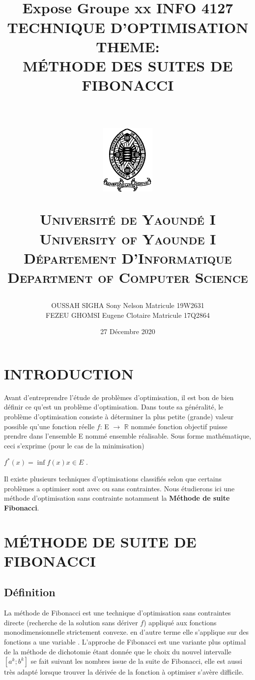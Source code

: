 \documentclass[a4paper,14pt]{article}
\title{
    \horrule{0.5pt} \\ [0.4cm]
    \Huge Expose Groupe xx INFO 4127 TECHNIQUE D'OPTIMISATION\\ THEME: \\ MÉTHODE DES SUITES DE FIBONACCI\\
    \horrule{2pt} \\[0.5cm]
\begin{center}
\includegraphics[width=100px]{univyde1}\\[15pt]
\end{center}
    \usefont{OT1}{bch}{b}{n}
    \normalfont \normalsize \textsc{Université de Yaoundé I\\University of Yaounde I} \\ [25pt]
    \normalfont \normalsize \textsc{Département D'Informatique\\Department of Computer Science} \\ [20pt]
 }
\author{
    \normalfont                                 
    OUSSAH SIGHA Sony Nelson Matricule 19W2631 \\[5pt]
    FEZEU GHOMSI Eugene Clotaire Matricule 17Q2864 \\[5pt] 
    \normalsize
}
\date{27 Décembre 2020}
\begin{document}
\maketitle

\pagebreak

\tableofcontents{}


\pagebreak


\section*{INTRODUCTION}

Avant d'entreprendre l'étude de problèmes d'optimisation, il est bon de bien définir ce
qu'est un problème d'optimisation. Dans toute sa généralité, le problème d'optimisation
consiste à déterminer la plus petite (grande) valeur possible qu'une fonction réelle $f$: E $\longrightarrow$ $\mathbb{R}$ nommée fonction objectif puisse prendre dans l'ensemble E nommé ensemble réalisable. Sous forme mathématique, ceci s'exprime (pour le cas de la minimisation)

\begin{center}
$ f^{*}(x) = \inf f(x) x \in E $ .
\end{center}

Il existe plusieurs techniques d'optimisations classifiés selon que certains problèmes a optimiser sont avec ou sans contraintes. Nous étudierons ici une méthode d'optimisation sans contrainte notamment la \textbf{Méthode de suite Fibonacci}.\\

\section{MÉTHODE DE SUITE DE FIBONACCI}

\subsection{Définition}

La méthode de Fibonacci est une technique d'optimisation sans contraintes directe (recherche de la solution sans dériver $f$) appliqué aux fonctions monodimensionnelle strictement convexe. en d'autre terme elle s'applique sur des fonctions a une variable  . L'approche de Fibonacci est une variante plus optimal de la méthode de dichotomie étant donnée que le choix du nouvel intervalle $[a^{k}; b^{k}]$ se fait suivant les nombres issue de la suite de Fibonacci, elle est aussi très adapté lorsque trouver la dérivée de la fonction à optimiser s'avère difficile.
\end{document}
